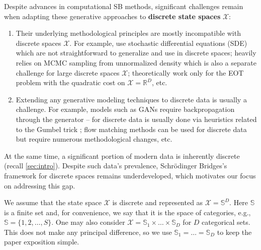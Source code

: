 Despite advances in computational SB methods, significant challenges remain when adapting these generative approaches to \textbf{discrete state spaces} $\mathcal{X}$:
\begin{enumerate}[leftmargin=*]
    \item Their underlying methodological principles are mostly incompatible with discrete spaces $\mathcal{X}$. For example, \cite{shi2023diffusion,gushchin2023entropic,vargas2021solving,liu2022deep} use stochastic differential equations (SDE) which are not straightforward to generalize and use in discrete spaces; \citep{mokrov2023energy} heavily relies on MCMC sampling from unnormalized density which is also a separate challenge for large discrete spaces $\mathcal{X}$; \citep{gushchin2024light,korotin2024light,gushchin2024adversarial} theoretically work only for the EOT problem with the quadratic cost on $\mathcal{X}=\mathbb{R}^{D}$, etc. 
    \item Extending any generative modeling techniques to discrete data is usually a challenge. For example, models such as GANs \citep{goodfellow2014generative} require backpropagation through the generator -- for discrete data is usually done via heuristics related to the Gumbel trick \citep{jang2017categorical}; flow matching methods \cite{liu2022flow} can be used for discrete data \citep{gat2024discrete} but require numerous methodological changes, etc.
\end{enumerate}

At the same time, a significant portion of modern data is inherently discrete (recall \wasyparagraph\ref{sec:intro}). Despite such data's prevalence, Schrödinger Bridges's framework for discrete spaces remains underdeveloped, which motivates our focus on addressing this gap. 

We assume that the state space $\mathcal{X}$ is discrete and represented as $\mathcal{X}=\mathbb{S}^{D}$. Here $\mathbb{S}$ is a finite set and, for convenience, we say that it is the space of categories, e.g., $\mathbb{S}=\{1,2,\dots, S\}$. One may also consider $\mathcal{X}=\mathbb{S}_{1}\times \dots \times \mathbb{S}_{D}$ for $D$ categorical sets. This does not make any principal difference, so we use $\mathbb{S}_{1}=\dots=\mathbb{S}_{D}$ to keep the paper exposition simple.

